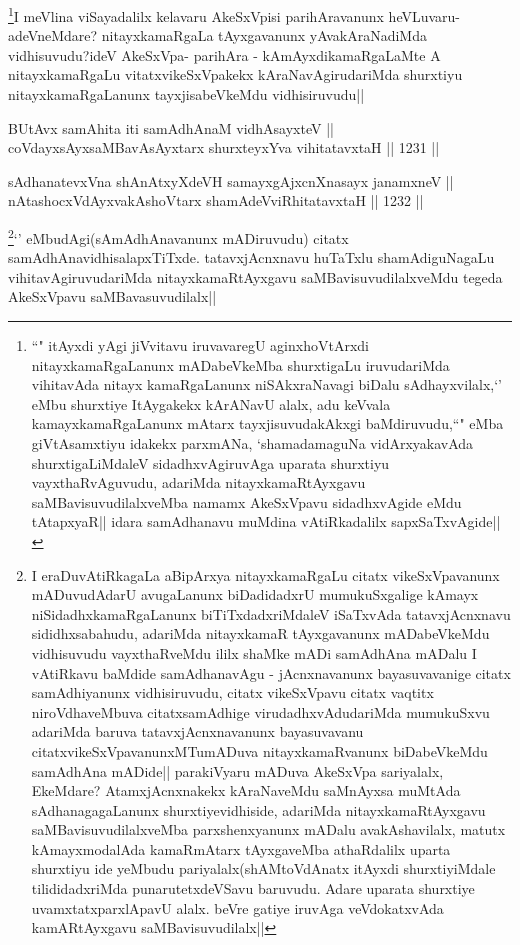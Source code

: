 \begin{artha}
\footnote{``\stext" itAyxdi yAgi jiVvitavu iruvavaregU aginxhoVtArxdi nitayxkamaRgaLanunx mADabeVkeMba shurxtigaLu iruvudariMda vihitavAda nitayx kamaRgaLanunx niSAkxraNavagi biDalu sAdhayxvilalx,`\stext' eMbu shurxtiye ItAygakekx kArANavU alalx, adu keVvala kamayxkamaRgaLanunx mAtarx tayxjisuvudakAkxgi baMdiruvudu,``\stext" eMba giVtAsamxtiyu idakekx parxmANa, `shamadamaguNa vidArxyakavAda shurxtigaLiMdaleV sidadhxvAgiruvAga uparata shurxtiyu vayxthaRvAguvudu, adariMda nitayxkamaRtAyxgavu saMBavisuvudilalxveMba namamx AkeSxVpavu sidadhxvAgide eMdu tAtapxyaR|| idara samAdhanavu muMdina vAtiRkadalilx sapxSaTxvAgide||}I meVlina viSayadalilx kelavaru AkeSxVpisi parihAravanunx heVLuvaru-adeVneMdare? nitayxkamaRgaLa tAyxgavanunx yAvakAraNadiMda vidhisuvudu?ideV AkeSxVpa- parihAra - kAmAyxdikamaRgaLaMte A nitayxkamaRgaLu vitatxvikeSxVpakekx kAraNavAgirudariMda shurxtiyu nitayxkamaRgaLanunx tayxjisabeVkeMdu vidhisiruvudu||
\end{artha}


\begin{shl}
BUtAvx samAhita iti samAdhAnaM vidhAsayxteV || \\
coVdayxsAyxsaMBavA\s sAyxtarx shurxteyxYva vihitatavxtaH ||  1231 ||  
\end{shl}
				
\begin{shl}
sAdhanatevxVna shAnAtxyXdeVH samayxgAjxcnXnasayx janamxneV || \\
nAtashocxVdAyxvakAshoV\s tarx shamAdeVviRhitatavxtaH ||  1232 ||  
\end{shl}

\begin{artha}
\footnote{I eraDuvAtiRkagaLa aBipArxya nitayxkamaRgaLu citatx vikeSxVpavanunx mADuvudAdarU avugaLanunx biDadidadxrU mumukuSxgalige kAmayx niSidadhxkamaRgaLanunx biTiTxdadxriMdaleV iSaTxvAda tatavxjAcnxnavu sididhxsabahudu, adariMda nitayxkamaR tAyxgavanunx mADabeVkeMdu vidhisuvudu vayxthaRveMdu ililx shaMke mADi samAdhAna  mADalu I vAtiRkavu baMdide samAdhanavAgu - jAcnxnavanunx bayasuvavanige citatx samAdhiyanunx vidhisiruvudu, citatx vikeSxVpavu citatx vaqtitx niroVdhaveMbuva citatxsamAdhige virudadhxvAdudariMda mumukuSxvu adariMda baruva tatavxjAcnxnavanunx bayasuvavanu citatxvikeSxVpavanunxMTumADuva nitayxkamaRvanunx biDabeVkeMdu samAdhAna mADide|| parakiVyaru mADuva AkeSxVpa sariyalalx, EkeMdare? AtamxjAcnxnakekx kAraNaveMdu saMnAyxsa muMtAda sAdhanagagaLanunx shurxtiyevidhiside, adariMda nitayxkamaRtAyxgavu saMBavisuvudilalxveMba parxshenxyanunx mADalu avakAshavilalx, matutx kAmayxmodalAda kamaRmAtarx tAyxgaveMba athaRdalilx uparta shurxtiyu ide yeMbudu pariyalalx(shAMtoVdAnatx itAyxdi shurxtiyiMdale tilididadxriMda punarutetxdeVSavu baruvudu. Adare uparata shurxtiye uvamxtatxparxlApavU alalx. beVre gatiye iruvAga veVdokatxvAda kamARtAyxgavu saMBavisuvudilalx||}`\stext' eMbudAgi(sAmAdhAnavanunx mADiruvudu) citatx samAdhAnavidhisalapxTiTxde. tatavxjAcnxnavu huTaTxlu shamAdiguNagaLu vihitavAgiruvudariMda nitayxkamaRtAyxgavu saMBavisuvudilalxveMdu tegeda AkeSxVpavu saMBavasuvudilalx||
\end{artha}

